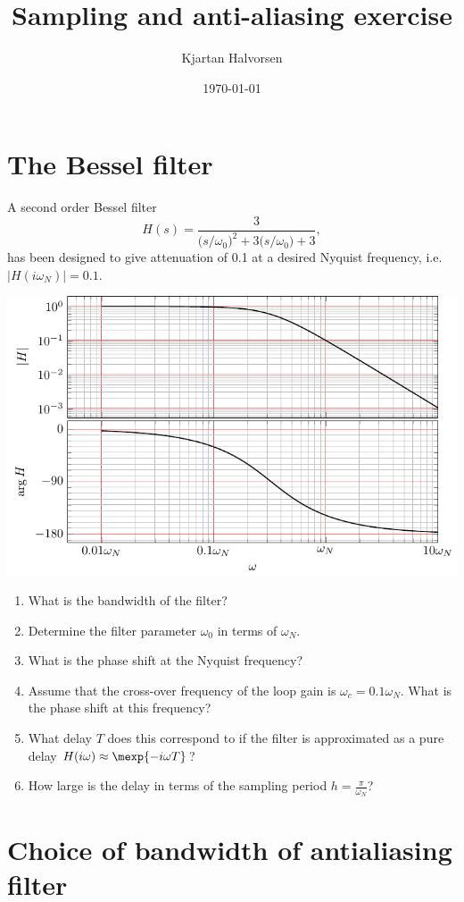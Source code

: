 \documentclass[letterpaper]{scrartcl}
\author{Kjartan Halvorsen}
\date{\today}
\title{Sampling and anti-aliasing exercise}
\begin{document}
\maketitle

\section*{The Bessel filter}
\label{sec-1}
  A second order Bessel filter
\[ H(s) = \frac{3}{\big(s/\omega_0\big)^2 + 3\big(s/\omega_0\big) + 3}, \]
has been designed to give attenuation of 0.1 at a desired Nyquist frequency, i.e. \(|H(i\omega_N)| = 0.1\).

\begin{center}
\includegraphics[width=0.8\linewidth]{../../figures/ps7-bessel-bode}
\end{center}

\begin{enumerate}
\item What is the bandwidth of the filter?
\item Determine the filter parameter \(\omega_0\) in terms of \(\omega_N\).
\item What is the phase shift at the Nyquist frequency?
\item Assume that the cross-over frequency of the loop gain is \(\omega_c = 0.1\omega_N\). What is the phase shift at this frequency?
\item What delay $T$  does this correspond to if the filter is approximated as a pure delay \(H(i\omega) \approx \mexp{-i\omega T}\)?
\item How large is the delay in terms of the sampling period \(h = \frac{\pi}{\omega_N}\)?
\end{enumerate}


\section*{Choice of bandwidth of antialiasing filter}
\label{sec-2}
\end{document}
